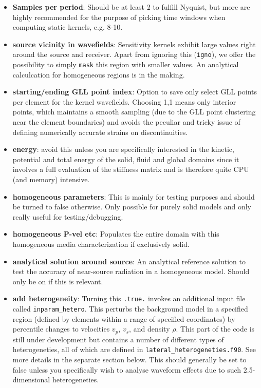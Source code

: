 \documentclass[11pt,letter,fleqn,english,notitlepage]{article}
\begin{document}
\begin{itemize}
    \item \textbf{Samples per period}: Should be at least 2 to fulfill Nyquist,
    but more are highly recommended for the purpose of picking time windows
    when computing static kernels, e.g. 8-10.
    
    \item \textbf{source vicinity in wavefields}: Sensitivity kernels exhibit
    large values right around the source and receiver. Apart from ignoring this
    ({\tt igno}), we offer the possibility to simply {\tt mask} this region
    with smaller values.  An analytical calculcation for homogeneous regions is
    in the making.
    
    \item \textbf{starting/ending GLL point index}: Option to save only select
    GLL points per element for the kernel wavefields. Choosing 1,1 means only
    interior points, which maintains a smooth sampling (due to the GLL point
    clustering near the element boundaries) and avoids the peculiar and tricky
    issue of defining numerically accurate strains on discontinuities.
    
    \item  \textbf{energy}: avoid this unless you are specifically interested
    in the kinetic, potential and total energy of the solid, fluid and global
    domains since it involves a full evaluation of the stiffness matrix and is
    therefore quite CPU (and memory) intensive. 
    
    \item  \textbf{homogeneous parameters}: This is mainly for testing purposes
    and should be turned to false otherwise. Only possible for purely solid
    models and only really useful for testing/debugging.
    
    \item \textbf{homogeneous P-vel etc}: Populates the entire domain with this 
    homogeneous media characterization if exclusively solid.
    
    \item \textbf{analytical solution around source}: An analytical reference
    solution to test the accuracy of near-source radiation in a homogeneous
    model. Should only be on if this is relevant.
    
    \item \textbf{add heterogeneity}: Turning this {\tt .true.} invokes an
    additional input file called {\tt inparam\_hetero}.  This perturbs the
    background model in a specified region (defined by elements within a range
    of specified coordinates) by percentile changes to velocities $v_p$, $v_s$,
    and density $\rho$. This part of the code is still under development but
    contains a number of different types of heterogeneties, all of which are
    defined in {\tt lateral\_heterogeneties.f90}. See more details in the
    separate section below.  This should generally be set to false unless you
    specifically wish to analyse waveform effects due to such 2.5-dimensional
    heterogeneties. 
    

\end{itemize}
\end{document}
